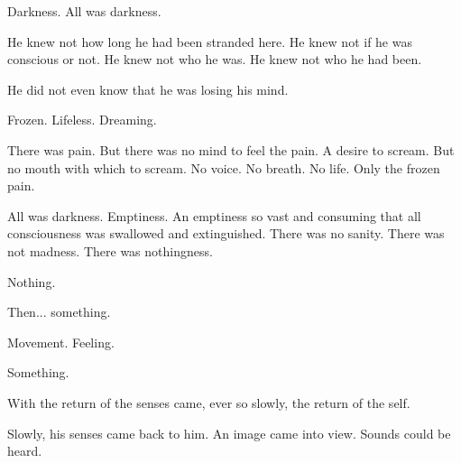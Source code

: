 
\begin{comment}
\subsection{Frozen}
\end{comment}

Darkness. 
All was darkness. 

He knew not how long he had been stranded here. 
He knew not if he was conscious or not. 
He knew not who he was. 
He knew not who he had been. 

He did not even know that he was losing his mind. 

Frozen. 
Lifeless. 
Dreaming. 

There was pain. 
But there was no mind to feel the pain. 
A desire to scream. 
But no mouth with which to scream. 
No voice. 
No breath. 
No life. 
Only the frozen pain. 

All was darkness. 
Emptiness. 
An emptiness so vast and consuming that all consciousness was swallowed and extinguished. 
There was no sanity. 
There was not madness. 
There was nothingness. 

Nothing. 



\new
Then... something. 

Movement. 
Feeling. 

Something. 


With the return of the senses came, ever so slowly, the return of the self. 




\begin{comment}
\subsection{The River}
\end{comment}

Slowly, his senses came back to him. 
An image came into view. 
Sounds could be heard. 

